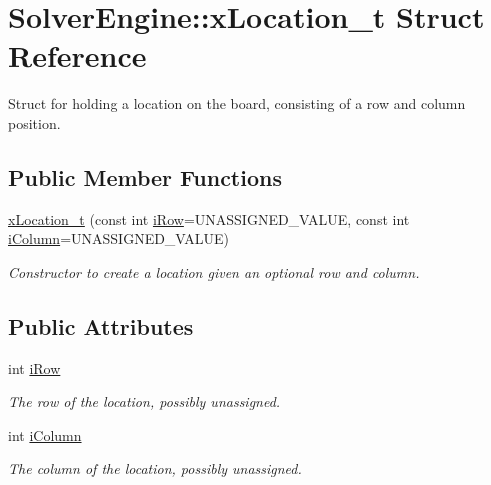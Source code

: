 \hypertarget{struct_solver_engine_1_1x_location__t}{}\section{Solver\+Engine\+:\+:x\+Location\+\_\+t Struct Reference}
\label{struct_solver_engine_1_1x_location__t}


Struct for holding a location on the board, consisting of a row and column position.  


\subsection*{Public Member Functions}
\begin{DoxyCompactItemize}
\item 
\mbox{\hyperlink{struct_solver_engine_1_1x_location__t_a7466ef246a603cfd998e4ea8cc51d9e5}{x\+Location\+\_\+t}} (const int \mbox{\hyperlink{struct_solver_engine_1_1x_location__t_a052ea5f4e2760513470f791b5c12a9b9}{i\+Row}}=U\+N\+A\+S\+S\+I\+G\+N\+E\+D\+\_\+\+V\+A\+L\+UE, const int \mbox{\hyperlink{struct_solver_engine_1_1x_location__t_ae6c026e4d241ddfdf65939513595578f}{i\+Column}}=U\+N\+A\+S\+S\+I\+G\+N\+E\+D\+\_\+\+V\+A\+L\+UE)
\begin{DoxyCompactList}\small\item\em Constructor to create a location given an optional row and column. \end{DoxyCompactList}\end{DoxyCompactItemize}
\subsection*{Public Attributes}
\begin{DoxyCompactItemize}
\item 
int \mbox{\hyperlink{struct_solver_engine_1_1x_location__t_a052ea5f4e2760513470f791b5c12a9b9}{i\+Row}}
\begin{DoxyCompactList}\small\item\em The row of the location, possibly unassigned. \end{DoxyCompactList}\item 
int \mbox{\hyperlink{struct_solver_engine_1_1x_location__t_ae6c026e4d241ddfdf65939513595578f}{i\+Column}}
\begin{DoxyCompactList}\small\item\em The column of the location, possibly unassigned. \end{DoxyCompactList}\end{DoxyCompactItemize}


